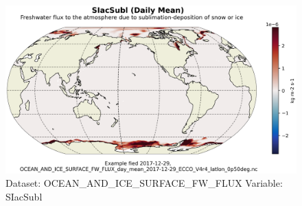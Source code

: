\begin{figure}[H]
\centering
\includegraphics[scale=0.55]{../images/plots/latlon_plots/Ocean_and_Sea-Ice_Surface_Freshwater_Fluxes/SIacSubl.png}
\caption{Dataset: OCEAN\_AND\_ICE\_SURFACE\_FW\_FLUX Variable: SIacSubl}
\label{tab:table-OCEAN_AND_ICE_SURFACE_FW_FLUX_SIacSubl-Plot}
\end{figure}
\pagebreak
